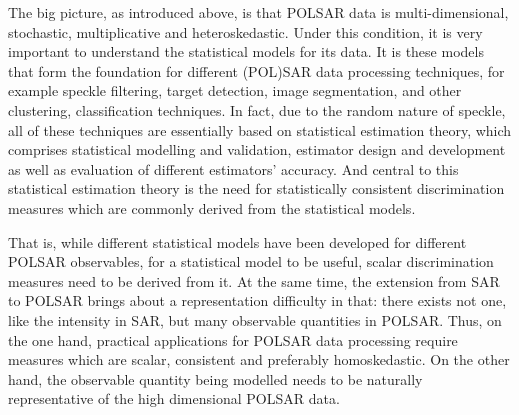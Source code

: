 The
                big picture, as introduced above, is that POLSAR data is multi-dimensional,
                stochastic, multiplicative and heteroskedastic.
Under this condition, it is very important to understand the statistical models for its
data. It is these models that form the foundation for different (POL)SAR data processing
techniques, for example speckle filtering, target detection, image segmentation, and
other clustering, classification techniques.
In fact, due to the random nature of speckle, all of these techniques are essentially based on statistical estimation theory,
which comprises statistical modelling and validation, estimator design and development
as well as evaluation of different estimators' accuracy. And central to this statistical
estimation theory is the need for statistically consistent discrimination measures which
are commonly derived from the statistical models.

That is, while different statistical models have been developed for different POLSAR
observables, for a statistical model to be useful, scalar discrimination measures need to
be derived from it. At the same time, the extension from SAR to POLSAR brings about
a representation difficulty in that: there exists not one, like the intensity in SAR, but
many observable quantities in POLSAR. Thus, on the one hand, practical applications for
POLSAR data processing require measures which are scalar, consistent and preferably
homoskedastic. On the other hand, the observable quantity being modelled needs to
be naturally representative of the high dimensional POLSAR data.

